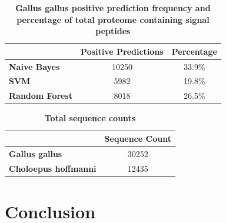 \documentclass[10pt,letterpaper]{article}
\begin{document}
	\begin{table}[!ht]
		\centering
		\caption{{\bf Gallus gallus positive prediction frequency and percentage of total proteome containing signal peptides}}
		\label{tab:chicken}
		\begin{tabular}{@{}lcc@{}}
			\toprule
			& \multicolumn{1}{l}{Positive Predictions} & \multicolumn{1}{l}{Percentage} \\ \midrule
			\textbf{Naive Bayes}   & 10250                                    & 33.9\%                         \\
			\textbf{SVM}           & 5982                                     & 19.8\%                         \\
			\textbf{Random Forest} & 8018                                     & 26.5\%                        
		\end{tabular}
	\end{table}
	
	\begin{table}[!ht]
		\centering
		\caption{{\bf Total sequence counts }}
		\label{tab:prot-count}
		\begin{tabular}{@{}lc@{}}
			\toprule
			& \multicolumn{1}{l}{Sequence Count} \\ \midrule
			\textbf{Gallus gallus}       & 30252                              \\
			\textbf{Choloepus hoffmanni} & 12435                             
		\end{tabular}
	\end{table}
	
	\section*{Conclusion}
	
	

	\nolinenumbers
	
\end{document}

